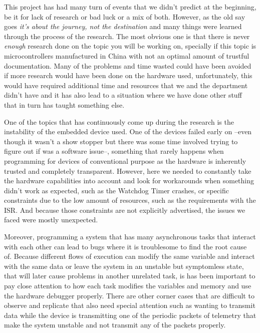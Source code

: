 This project has had many turn of events that we didn't predict at the beginning, be it for lack of research or bad luck or a mix of both. However, as the old say goes \textit{it's about the journey, not the destination} and many things were learned through the process of the research.
The most obvious one is that there is never \textit{enough} research done on the topic you will be working on, specially if this topic is microcontrollers manufactured in China with not an optimal amount of trustful documentation. Many of the problems and time wasted could have been avoided if more research would have been done on the hardware used, unfortunately, this would have required additional time and resources that we and the department didn't have and it has also lead to a situation where we have done other stuff that in turn has taught something else.

One of the topics that has continuously come up during the research is the instability of the embedded device used. One of the devices failed early on --even though it wasn't a show stopper but there was some time involved trying to figure out if was a software issue--, something that rarely happens when programming for devices of conventional purpose as the hardware is inherently trusted and completely transparent. However, here we needed to constantly take the hardware capabilities into account and look for workarounds when something didn't work as expected, such as the Watchdog Timer crashes, or specific constraints due to the low amount of resources, such as the requirements with the ISR. And because those constraints are not explicitly advertised, the issues we faced were mostly unexpected.

Moreover, programming a system that has many asynchronous tasks that interact with each other can lead to bugs where it is troublesome to find the root cause of. Because different flows of execution can modify the same variable and interact with the same data or leave the system in an unstable but symptomless state, that will later cause problems in another unrelated task, is has been important to pay close attention to how each task modifies the variables and memory and use the hardware debugger properly. There are other corner cases that are difficult to observe and replicate that also need special attention such as wanting to transmit data while the device is transmitting one of the periodic packets of telemetry that make the system unstable and not transmit any of the packets properly.

